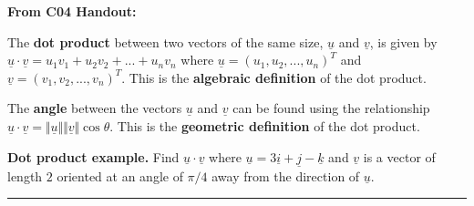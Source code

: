 \documentclass[12pt,letterpaper,noanswers]{exam}
\newcommand{\mb}[1]{\underline{#1}}
\begin{document}
\noindent\textbf{From C04 Handout:}
\begin{tcolorbox}
The \textbf{dot product} between two vectors of the same size, $\underline{u}$ and $\underline{v}$, is given by $\underline{u}\cdot\underline{v} = u_1v_1+u_2v_2+...+u_nv_n$ where $\underline{u} = (u_1, u_2,...,u_n)^T$ and $\underline{v} = (v_1, v_2, ..., v_n)^T$.  This is the \textbf{algebraic definition} of the dot product.

The \textbf{angle} between the vectors $\underline{u}$ and $\underline{v}$ can be found using the relationship 
$\underline{u}\cdot\underline{v} = \Vert \underline{u}\Vert\Vert\underline{v}\Vert\cos\theta$.  This is the \textbf{geometric definition} of the dot product.
\end{tcolorbox}

\noindent\textbf{Dot product example.}
 Find $\mb{u}\cdot\mb{v}$ where $\mb{u} = 3\mb{i} + \mb{j}-\mb{k}$ and $\mb{v}$ is a vector of length $2$ oriented at an angle of $\pi/4$ away from the direction of $\mb{u}$.
 
 \vspace{1in}







\vspace{0.2cm}
\hrule
\vspace{0.2cm}
\end{document}

